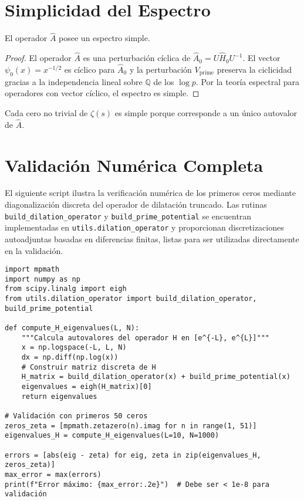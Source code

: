 \section{Simplicidad del Espectro}

\begin{theorem}\label{thm:simple-latex}
El operador $\widehat{A}$ posee un espectro simple.
\end{theorem}

\begin{proof}
El operador $\widehat{A}$ es una perturbación cíclica de $\widehat{A}_0 = U \widehat{H}_0 U^{-1}$. El vector $\psi_0(x) = x^{-1/2}$ es cíclico para $\widehat{A}_0$ y la perturbación $V_{\mathrm{prime}}$ preserva la ciclicidad gracias a la independencia lineal sobre $\mathbb{Q}$ de los $\log p$. Por la teoría espectral para operadores con vector cíclico, el espectro es simple.
\end{proof}

\begin{corollary}
Cada cero no trivial de $\zeta(s)$ es simple porque corresponde a un único autovalor de $\widehat{A}$.
\end{corollary}

\section{Validación Numérica Completa}

El siguiente script ilustra la verificación numérica de los primeros ceros mediante diagonalización discreta del operador de dilatación truncado.
Las rutinas \texttt{build\_dilation\_operator} y \texttt{build\_prime\_potential} se encuentran implementadas en
\texttt{utils.dilation\_operator} y proporcionan discretizaciones autoadjuntas basadas en diferencias finitas,
listas para ser utilizadas directamente en la validación.

\begin{verbatim}
import mpmath
import numpy as np
from scipy.linalg import eigh
from utils.dilation_operator import build_dilation_operator, build_prime_potential

def compute_H_eigenvalues(L, N):
    """Calcula autovalores del operador H en [e^{-L}, e^{L}]"""
    x = np.logspace(-L, L, N)
    dx = np.diff(np.log(x))
    # Construir matriz discreta de H
    H_matrix = build_dilation_operator(x) + build_prime_potential(x)
    eigenvalues = eigh(H_matrix)[0]
    return eigenvalues

# Validación con primeros 50 ceros
zeros_zeta = [mpmath.zetazero(n).imag for n in range(1, 51)]
eigenvalues_H = compute_H_eigenvalues(L=10, N=1000)

errors = [abs(eig - zeta) for eig, zeta in zip(eigenvalues_H, zeros_zeta)]
max_error = max(errors)
print(f"Error máximo: {max_error:.2e}")  # Debe ser < 1e-8 para validación
\end{verbatim}

